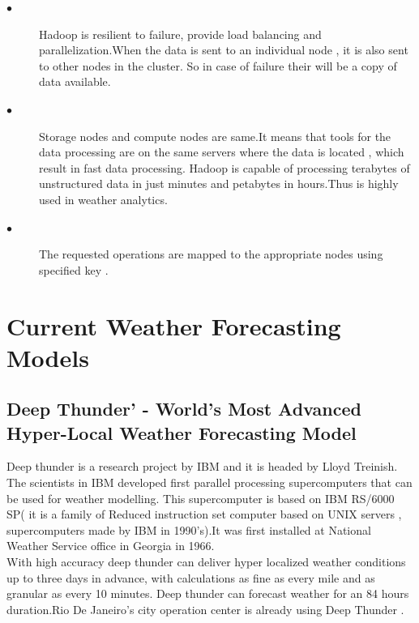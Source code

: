 \documentclass[sigconf]{acmart}
\begin{document}
\begin{description}

\item [$\bullet$]Hadoop is resilient to failure, provide load balancing and parallelization.When the data is sent to an individual node , it is also sent to other nodes in the cluster. So in case of failure their will be a copy of data available.

\item [$\bullet$] Storage nodes and compute nodes are same.It means that tools for the data processing are on the same servers where the data is located , which result in fast data processing. Hadoop is capable of processing terabytes of unstructured data in just minutes and petabytes in hours.Thus is highly used in weather analytics.

\item [$\bullet$] The requested operations are mapped to the appropriate nodes using specified key \cite{Hadoop01}.

\end{description}

\section{Current Weather Forecasting Models}



\subsection{Deep Thunder' - World's Most Advanced Hyper-Local Weather Forecasting Model}


Deep thunder is a research project by IBM and it is headed by Lloyd Treinish. The scientists in IBM developed first parallel processing supercomputers that can be used for weather modelling. This supercomputer is based on IBM RS/6000 SP( it is a family of Reduced instruction set computer based on UNIX servers , supercomputers made by IBM in 1990's).It was first installed at National Weather Service office in Georgia in 1966.\\
With high accuracy deep thunder can deliver hyper localized weather conditions up to three days in advance, with calculations as fine as every mile and as granular as every 10 minutes. Deep thunder can forecast weather for an 84 hours duration.Rio De Janeiro's city operation center is already using Deep Thunder \cite{Coclus01}.
\end{document}
